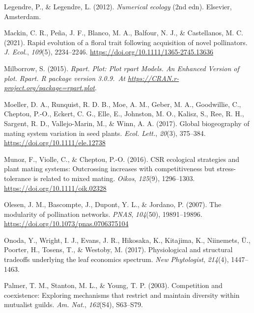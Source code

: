 \documentclass[
  12pt,
  a4paper,
]{article}
\newlength{\cslhangindent}
\newlength{\cslentryspacingunit} %
\newenvironment{CSLReferences}[2] %
 {%
  \setlength{\parindent}{0pt}
  \ifodd #1
  \let\oldpar\par
  \def\par{\hangindent=\cslhangindent\oldpar}
  \fi
  \setlength{\parskip}{#2\cslentryspacingunit}
 }%
 {}
\begin{document}
\begin{CSLReferences}{1}{0}
\leavevmode{}%
Legendre, P., \& Legendre, L. (2012). \emph{Numerical ecology} ({2nd edn}). {Elsevier, Amsterdam}.

\leavevmode{}%
Mackin, C. R., Peña, J. F., Blanco, M. A., Balfour, N. J., \& Castellanos, M. C. (2021). Rapid evolution of a floral trait following acquisition of novel pollinators. \emph{J. Ecol.}, \emph{109}(5), 2234--2246. \url{https://doi.org/10.1111/1365-2745.13636}

\leavevmode{}%
Milborrow, S. (2015). \emph{Rpart. Plot: {Plot} rpart {Models}. {An Enhanced Version} of plot. Rpart. R package version 3.0.9.~At \href{https://CRAN.R-project.org/package=rpart.plot}{https://CRAN.r-project.org/package=rpart.plot}}.

\leavevmode{}%
Moeller, D. A., Runquist, R. D. B., Moe, A. M., Geber, M. A., Goodwillie, C., Cheptou, P.-O., Eckert, C. G., Elle, E., Johnston, M. O., Kalisz, S., Ree, R. H., Sargent, R. D., Vallejo-Marin, M., \& Winn, A. A. (2017). Global biogeography of mating system variation in seed plants. \emph{Ecol. Lett.}, \emph{20}(3), 375--384. \url{https://doi.org/10.1111/ele.12738}

\leavevmode{}%
Munoz, F., Violle, C., \& Cheptou, P.-O. (2016). {CSR} ecological strategies and plant mating systems: Outcrossing increases with competitiveness but stress-tolerance is related to mixed mating. \emph{Oikos}, \emph{125}(9), 1296--1303. \url{https://doi.org/10.1111/oik.02328}

\leavevmode{}%
Olesen, J. M., Bascompte, J., Dupont, Y. L., \& Jordano, P. (2007). The modularity of pollination networks. \emph{PNAS}, \emph{104}(50), 19891--19896. \url{https://doi.org/10.1073/pnas.0706375104}

\leavevmode{}%
Onoda, Y., Wright, I. J., Evans, J. R., Hikosaka, K., Kitajima, K., Niinemets, Ü., Poorter, H., Tosens, T., \& Westoby, M. (2017). Physiological and structural tradeoffs underlying the leaf economics spectrum. \emph{New Phytologist}, \emph{214}(4), 1447--1463.

\leavevmode{}%
Palmer, T. M., Stanton, M. L., \& Young, T. P. (2003). Competition and coexistence: Exploring mechanisms that restrict and maintain diversity within mutualist guilds. \emph{Am. Nat.}, \emph{162}(S4), S63--S79.


\end{CSLReferences}
\end{document}
